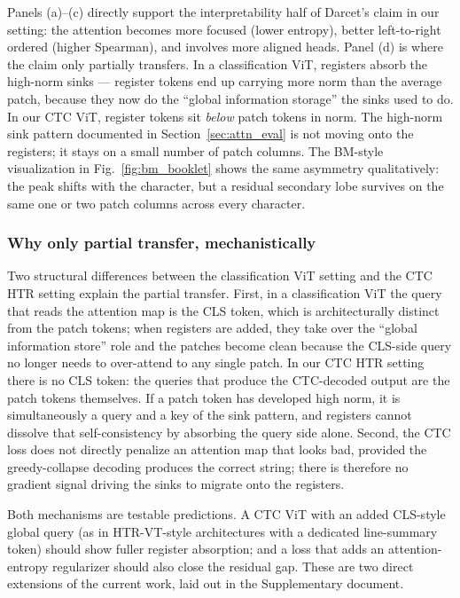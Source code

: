 Panels (a)--(c) directly support the interpretability half of Darcet's claim in our setting: the attention becomes more focused (lower entropy), better left-to-right ordered (higher Spearman), and involves more aligned heads. Panel (d) is where the claim only partially transfers. In a classification ViT, registers absorb the high-norm sinks --- register tokens end up carrying more norm than the average patch, because they now do the ``global information storage'' the sinks used to do. In our CTC ViT, register tokens sit \emph{below} patch tokens in norm. The high-norm sink pattern documented in Section~\ref{sec:attn_eval} is not moving onto the registers; it stays on a small number of patch columns. The BM-style visualization in Fig.~\ref{fig:bm_booklet} shows the same asymmetry qualitatively: the peak shifts with the character, but a residual secondary lobe survives on the same one or two patch columns across every character.

\subsubsection{Why only partial transfer, mechanistically}

Two structural differences between the classification ViT setting and the CTC HTR setting explain the partial transfer. First, in a classification ViT the query that reads the attention map is the CLS token, which is architecturally distinct from the patch tokens; when registers are added, they take over the ``global information store'' role and the patches become clean because the CLS-side query no longer needs to over-attend to any single patch. In our CTC HTR setting there is no CLS token: the queries that produce the CTC-decoded output are the patch tokens themselves. If a patch token has developed high norm, it is simultaneously a query and a key of the sink pattern, and registers cannot dissolve that self-consistency by absorbing the query side alone. Second, the CTC loss does not directly penalize an attention map that looks bad, provided the greedy-collapse decoding produces the correct string; there is therefore no gradient signal driving the sinks to migrate onto the registers.

Both mechanisms are testable predictions. A CTC ViT with an added CLS-style global query (as in HTR-VT-style architectures with a dedicated line-summary token) should show fuller register absorption; and a loss that adds an attention-entropy regularizer should also close the residual gap. These are two direct extensions of the current work, laid out in the Supplementary document.

